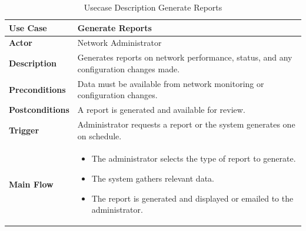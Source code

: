 \begin{table}[H]
    \centering
    \caption{Usecase Description Generate Reports}
    \renewcommand{\arraystretch}{1.3}
    \begin{tabular}{|p{3cm}|p{11cm}|}
        \hline
        \textbf{Use Case} & \textbf{Generate Reports} \\
        \hline
        \textbf{Actor} & Network Administrator \\
        \hline
        \textbf{Description} & Generates reports on network performance, status, and any configuration changes made. \\
        \hline
        \textbf{Preconditions} & Data must be available from network monitoring or configuration changes. \\
        \hline
        \textbf{Postconditions} & A report is generated and available for review. \\
        \hline
        \textbf{Trigger} & Administrator requests a report or the system generates one on schedule. \\
        \hline
        \textbf{Main Flow} & 
        \begin{itemize}
            \item The administrator selects the type of report to generate.
            \item The system gathers relevant data.
            \item The report is generated and displayed or emailed to the administrator.
        \end{itemize} \\
        \hline
    \end{tabular}
\end{table}
